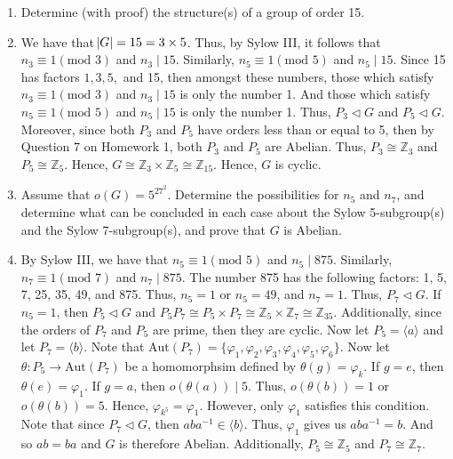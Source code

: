 \documentclass[12pt]{article}
\makeatletter
\theoremstyle{definition}
\theoremstyle{remark}
\renewenvironment{proof}[1][\proofname]{\par
  \pushQED{\qed}%
  \normalfont \topsep6\p@\@plus6\p@\relax
  \list{}{\leftmargin=0mm
          \rightmargin=4mm
          \settowidth{\itemindent}{\itshape#1}%
          \labelwidth=\itemindent
          \parsep=0pt \listparindent=\parindent 
  }
  \item[\hskip\labelsep
        \itshape
    #1\@addpunct{.}]\ignorespaces
}{%
  \popQED\endlist\@endpefalse
}
\let\oldproofname=\proofname
\renewcommand{\proofname}{\bf{\textit{\oldproofname}}}
\makeatother
\begin{document}
\begin{enumerate}[leftmargin=*]
        \item Determine (with proof) the structure(s) of a group of order 15.
            \begin{proof}
                We have that $\abs{G}=15=3\times 5$. Thus, by Sylow III, it follows that $n_3\equiv 1(\text{mod }3)$ and $n_3\mid 15$. Similarly, $n_5\equiv 1(\text{mod }5)$ and $n_5\mid 15$. Since 15 has factors $1, 3, 5,$ and 15, then amongst these numbers, those which satisfy $n_3\equiv 1(\text{mod }3)$ and $n_3\mid 15$ is only the number 1. And those which satisfy $n_5\equiv 1(\text{mod }5)$ and $n_5\mid 15$ is only the number 1. Thus, $P_3\triangleleft G$ and $P_5\triangleleft G$. Moreover, since both $P_3$ and $P_5$ have orders less than or equal to 5, then by Question 7 on Homework 1, both $P_3$ and $P_5$ are Abelian. Thus, $P_3\cong\mathbb{Z}_3$ and $P_5\cong\mathbb{Z}_5$. Hence, $G\cong\mathbb{Z}_3\times\mathbb{Z}_5\cong \mathbb{Z}_{15}$. Hence, $G$ is cyclic.
            \end{proof}
            
        \item Assume that $o(G)=5^27^2$. Determine the possibilities for $n_5$ and $n_7$, and determine what can be concluded in each case about the Sylow 5-subgroup(s) and the Sylow 7-subgroup(s), and prove that $G$ is Abelian.
            \begin{proof}
                By Sylow III, we have that $n_5\equiv 1(\text{mod }5)$ and $n_5\mid 875$. Similarly, $n_7\equiv 1(\text{mod }7)$ and $n_7\mid 875$. The number 875 has the following factors: 1, 5, 7, 25, 35, 49, and 875. Thus, $n_5=1$ or $n_5=49$, and $n_7=1$. Thus, $P_7\triangleleft G$. If $n_5=1$, then $P_5\triangleleft G$ and $P_5P_7\cong P_5\times P_7\cong\mathbb{Z}_5\times\mathbb{Z}_7\cong\mathbb{Z}_{35}$. Additionally, since the orders of $P_7$ and $P_5$ are prime, then they are cyclic. Now let $P_5=\langle a\rangle$ and let $P_7=\langle b\rangle$. Note that $\text{Aut}(P_7)=\{\varphi_1,\varphi_2,\varphi_3,\varphi_4, \varphi_5,\varphi_6\}$. Now let $\theta\colon P_5\rightarrow\text{Aut}(P_7)$ be a homomorphsim defined by $\theta(g)=\varphi_k$. If $g=e$, then $\theta(e)=\varphi_1$. If $g=a$, then $o(\theta(a))\mid 5$. Thus, $o(\theta(b))=1$ or $o(\theta(b))=5$. Hence, $\varphi_{k^5}=\varphi_1$. However, only $\varphi_1$ satisfies this condition. Note that since $P_7\triangleleft G$, then $aba^{-1}\in\langle b\rangle$. Thus, $\varphi_1$ gives us $aba^{-1}=b$. And so $ab=ba$ and $G$ is therefore Abelian. Additionally, $P_5\cong\mathbb{Z}_5$ and $P_7\cong\mathbb{Z}_7$.
            \end{proof}
            

\end{enumerate}
\end{document}
